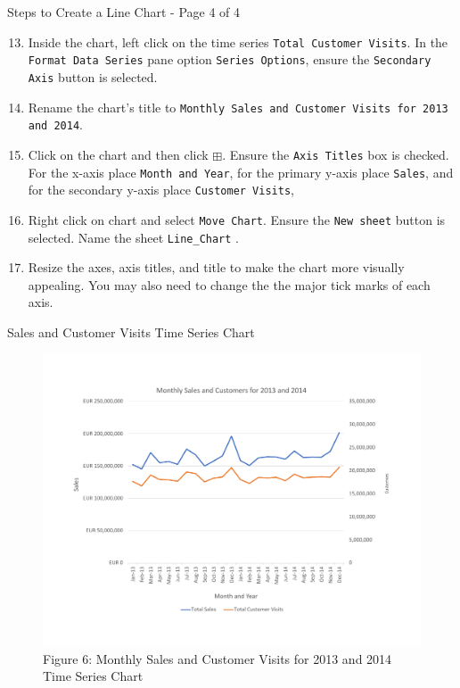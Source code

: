\documentclass[pdf]{beamer}
\theoremstyle{remark}
\theoremstyle{definition}
\begin{document}
\begin{frame}[t]{Steps to Create a Line Chart - Page 4 of 4}
 \small 
\begin{enumerate}
  \setcounter{enumi}{12}
\item Inside the chart, left click on the time series \texttt{Total Customer Visits}.  In the \texttt{Format Data Series} pane option \texttt{Series Options}, ensure the \texttt{Secondary Axis} button is selected. 
\item Rename the chart's title to  \texttt{Monthly Sales and Customer Visits for 2013 and 2014}. 
\item Click on the chart and then click \texttt{$\boxplus$}. Ensure the \texttt{Axis Titles} box is checked.  For the x-axis place \texttt{Month and Year}, for the primary y-axis place \texttt{Sales}, and for the secondary y-axis place \texttt{Customer Visits}, 
\item Right click on chart and select \texttt{Move Chart}.  Ensure the \texttt{New sheet} button is selected. Name the sheet \texttt{Line\_Chart} .
\item  Resize the axes, axis titles, and title to make the chart more visually appealing.  You may also need to change the the major tick marks of each axis.
\end{enumerate}
\end{frame}

\begin{frame}[t]{Sales and Customer Visits Time Series Chart}
\begin{figure}[htbp]
    \centering
    \captionsetup{justification=centering}
    \includegraphics[clip, trim=0cm 2.3cm 0cm 2.3cm, width=1.0\textwidth]{Line_Chart_Unit_3.pdf}
    \caption{Figure {\color{franklinblue} 6}: Monthly Sales and Customer Visits for 2013 and 2014 Time Series Chart}
    \label{fig:linechart}
\end{figure}
\end{frame}
\end{document}
